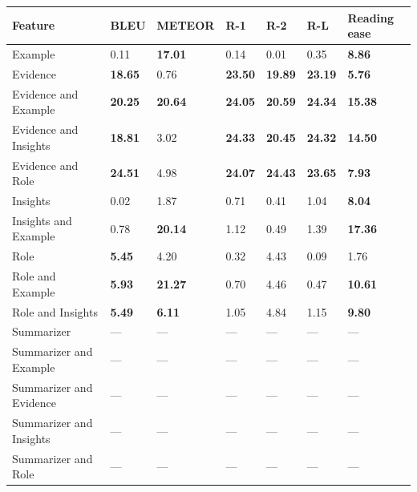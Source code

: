 \begin{tabular}{|l|l|l|l|l|l|l|}
\hline
\textbf{Feature} & BLEU & METEOR & R-1 & R-2 & R-L & Reading ease \\
 \hline
 Example & 0.11 & \textbf{17.01} & 0.14 & 0.01 & 0.35 & \textbf{8.86} \\
 \hline
 Evidence & \textbf{18.65} & 0.76 & \textbf{23.50} & \textbf{19.89} & \textbf{23.19} & \textbf{5.76} \\
 \hline
 Evidence and Example & \textbf{20.25} & \textbf{20.64} & \textbf{24.05} & \textbf{20.59} & \textbf{24.34} & \textbf{15.38} \\
 \hline
 Evidence and Insights & \textbf{18.81} & 3.02 & \textbf{24.33} & \textbf{20.45} & \textbf{24.32} & \textbf{14.50} \\
 \hline
 Evidence and Role & \textbf{24.51} & 4.98 & \textbf{24.07} & \textbf{24.43} & \textbf{23.65} & \textbf{7.93} \\
 \hline
 Insights & 0.02 & 1.87 & 0.71 & 0.41 & 1.04 & \textbf{8.04} \\
 \hline
 Insights and Example & 0.78 & \textbf{20.14} & 1.12 & 0.49 & 1.39 & \textbf{17.36} \\
 \hline
 Role & \textbf{5.45} & 4.20 & 0.32 & 4.43 & 0.09 & 1.76 \\
 \hline
 Role and Example & \textbf{5.93} & \textbf{21.27} & 0.70 & 4.46 & 0.47 & \textbf{10.61} \\
 \hline
 Role and Insights & \textbf{5.49} & \textbf{6.11} & 1.05 & 4.84 & 1.15 & \textbf{9.80} \\
 \hline
 Summarizer & — & — & — & — & — & — \\
 \hline
 Summarizer and Example & — & — & — & — & — & — \\
 \hline
 Summarizer and Evidence & — & — & — & — & — & — \\
 \hline
 Summarizer and Insights & — & — & — & — & — & — \\
 \hline
 Summarizer and Role & — & — & — & — & — & — \\
\hline
\end{tabular}
